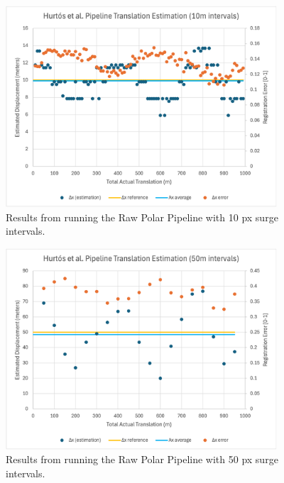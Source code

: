 \begin{figure}[H]
  \centering
  \includegraphics[width=0.9\textwidth]{figures/results/Translation-Surge/PC-0.png}
  \caption{Results from running the Raw Polar Pipeline with 10 px surge intervals.}
\end{figure}

\begin{figure}[H]
  \centering
  \includegraphics[width=0.9\textwidth]{figures/results/Translation-Surge/PC-4.png}
  \caption{Results from running the Raw Polar Pipeline with 50 px surge intervals.}
\end{figure}


